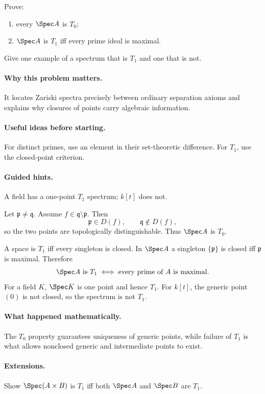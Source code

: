 \begin{problem}
Prove:
\begin{enumerate}
\item every $\Spec A$ is $T_0$;
\item $\Spec A$ is $T_1$ iff every prime ideal is maximal.
\end{enumerate}
Give one example of a spectrum that is $T_1$ and one that is not.
\end{problem}

\paragraph{Why this problem matters.}
It locates Zariski spectra precisely between ordinary separation axioms and explains why
closures of points carry algebraic information.

\paragraph{Useful ideas before starting.}
For distinct primes, use an element in their set-theoretic difference.  For $T_1$, use the
closed-point criterion.

\paragraph{Guided hints.}
A field has a one-point $T_1$ spectrum; $k[t]$ does not.

\begin{solution}
Let $\mathfrak p\neq\mathfrak q$.  Assume
$f\in\mathfrak q\setminus\mathfrak p$.  Then
\[
\mathfrak p\in D(f),\qquad \mathfrak q\notin D(f),
\]
so the two points are topologically distinguishable.  Thus $\Spec A$ is $T_0$.

A space is $T_1$ iff every singleton is closed.  In $\Spec A$ a singleton
$\{\mathfrak p\}$ is closed iff $\mathfrak p$ is maximal.  Therefore
\[
\Spec A\text{ is }T_1
\iff
\text{every prime of }A\text{ is maximal}.
\]
For a field $K$, $\Spec K$ is one point and hence $T_1$.  For $k[t]$, the generic point
$(0)$ is not closed, so the spectrum is not $T_1$.
\end{solution}

\paragraph{What happened mathematically.}
The $T_0$ property guarantees uniqueness of generic points, while failure of $T_1$ is what
allows nonclosed generic and intermediate points to exist.

\paragraph{Extensions.}
Show $\Spec(A\times B)$ is $T_1$ iff both $\Spec A$ and $\Spec B$ are $T_1$.
